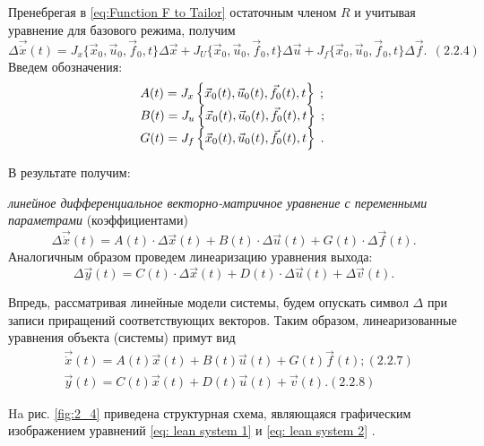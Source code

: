 \bigskip
		Пренебрегая в  \eqref{eq:Function F to Tailor} %
		остаточным членом  $R$ и учитывая уравнение для базового режима, получим
\begin{equation}\label{key}
		\Delta \vec{\dot x}(t)=J_x\{\vec x_0,\vec u_0,\vec f_0,t\}\Delta \vec x+J_U\{\vec x_0,\vec u_0,\vec f_0,t\}\Delta \vec u+J_f\{\vec
		x_0,\vec u_0,\vec f_0,t\}\Delta \vec f.\ \ (2.2.4)
\end{equation}
		Введем обозначения:
\begin{equation*}
\begin{matrix}A(t)=J_x\left\{\vec x_0(t),\vec u_0(t),\vec f_0(t),t\right\}\;;\hfill\null \\B(t)=J_u\left\{\vec
x_0(t),\vec u_0(t),\vec f_0(t),t\right\}\;;\hfill\null \\G(t)=J_f\left\{\vec x_0(t),\vec u_0(t),\vec
f_0(t),t\right\}\;.\hfill\null \end{matrix}\hfill 
\end{equation*}

		В результате получим:



		\textit{линейное дифференциальное векторно-матричное уравнение с переменными параметрами} (коэффициентами)
\begin{equation}\label{eq:Dif Mat Vec Eq}
		\Delta \vec{\dot x}(t)=A(t)\cdot \Delta \vec x(t)+B(t)\cdot \Delta \vec u(t)+G(t)\cdot \Delta \vec f(t). %
\end{equation}
		Аналогичным образом проведем линеаризацию уравнения выхода:
\begin{equation}\label{eq: lean eq exit}
		  \Delta \vec y(t)=C(t)\cdot \Delta \vec x(t)+D(t)\cdot \Delta \vec u(t)+\Delta \vec v(t). %
\end{equation}

		Впредь, рассматривая линейные модели системы, будем опускать символ $ \Delta $ при записи приращений соответствующих
		векторов. Таким образом, линеаризованные уравнения объекта (системы) примут вид
\begin{align}\label{eq: lean system 1}
		&\vec{\dot x}(t)=A(t)\vec x(t)+B(t)\vec u(t)+G(t)\vec f(t); (2.2.7)\\
		\label{eq: lean system 2}
		&\vec y(t)=C(t)\vec x(t)+D(t)\vec u(t)+\vec v(t).(2.2.8)
\end{align}



		Ha рис. \ref{fig:2_4} %
		приведена структурная схема, являющаяся графичес­ким изображением уравнений \eqref{eq: lean system 1} %
		и \eqref{eq: lean system 2}%
		.

